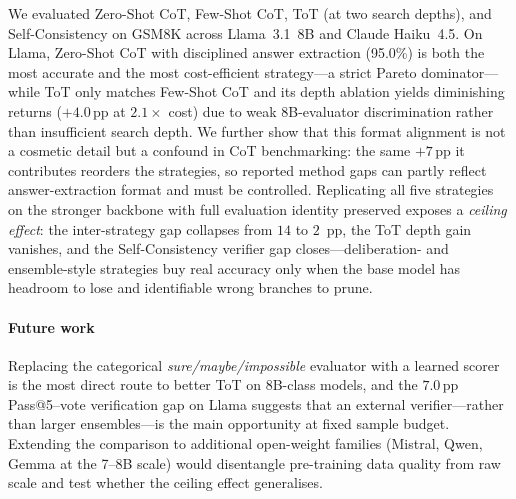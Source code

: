 \documentclass[conference]{IEEEtran}
\begin{document}
We evaluated Zero-Shot CoT, Few-Shot CoT, ToT (at two search depths),
and Self-Consistency on GSM8K across Llama~3.1~8B and Claude Haiku~4.5.
On Llama, Zero-Shot CoT with disciplined answer extraction (95.0\%) is
both the most accurate and the most cost-efficient strategy---a strict
Pareto dominator---while ToT only matches Few-Shot CoT and its depth
ablation yields diminishing returns ($+4.0$\,pp at $2.1\times$ cost)
due to weak 8B-evaluator discrimination rather than insufficient search
depth.
We further show that this format alignment is not a cosmetic
detail but a confound in CoT benchmarking: the same $+7$\,pp it
contributes reorders the strategies, so reported method gaps can
partly reflect answer-extraction format and must be controlled.
Replicating all five strategies on the stronger backbone with full
evaluation identity preserved exposes a \emph{ceiling effect}: the
inter-strategy gap collapses from $14$ to $2$~pp, the ToT depth gain
vanishes, and the Self-Consistency verifier gap closes---deliberation-
and ensemble-style strategies buy real accuracy only when the base
model has headroom to lose and identifiable wrong branches to prune.

\paragraph{Future work}
Replacing the categorical \textit{sure/maybe/impossible} evaluator with
a learned scorer is the most direct route to better ToT on 8B-class
models, and the $7.0$\,pp Pass@5--vote verification gap on Llama
suggests that an external verifier---rather than larger ensembles---is
the main opportunity at fixed sample budget.
Extending the comparison to additional open-weight families (Mistral,
Qwen, Gemma at the 7--8B scale) would disentangle pre-training data
quality from raw scale and test whether the ceiling effect generalises.
\end{document}
